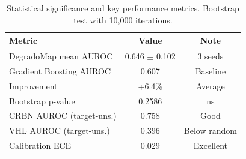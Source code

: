 \begin{table}[t]
\centering
\caption{Statistical significance and key performance metrics. Bootstrap test with 10,000 iterations.}
\label{tab:significance_summary}
\small
\begin{tabular}{@{}lcc@{}}
\toprule
\textbf{Metric} & \textbf{Value} & \textbf{Note} \\
\midrule
DegradoMap mean AUROC & 0.646 $\pm$ 0.102 & 3 seeds \\
Gradient Boosting AUROC & 0.607 & Baseline \\
Improvement & +6.4\% & Average \\
Bootstrap p-value & 0.2586 & ns \\
\midrule
CRBN AUROC (target-uns.) & 0.758 & Good \\
VHL AUROC (target-uns.) & 0.396 & Below random \\
\midrule
Calibration ECE & 0.029 & Excellent \\
\bottomrule
\end{tabular}
\end{table}

